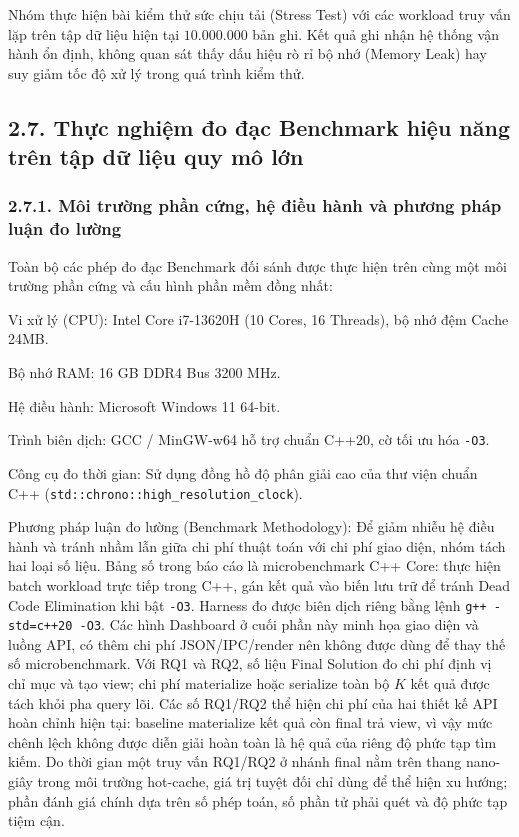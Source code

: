 \documentclass[14pt,a4paper]{extarticle}
\begin{document}
Nhóm thực hiện bài kiểm thử sức chịu tải (Stress Test) với các workload truy vấn lặp trên tập dữ liệu hiện tại $10.000.000$ bản ghi. Kết quả ghi nhận hệ thống vận hành ổn định, không quan sát thấy dấu hiệu rò rỉ bộ nhớ (Memory Leak) hay suy giảm tốc độ xử lý trong quá trình kiểm thử.

\subsection*{2.7. Thực nghiệm đo đạc Benchmark hiệu năng trên tập dữ liệu quy mô lớn}
{}

\subsubsection*{2.7.1. Môi trường phần cứng, hệ điều hành và phương pháp luận đo lường}
{}

Toàn bộ các phép đo đạc Benchmark đối sánh được thực hiện trên cùng một môi trường phần cứng và cấu hình phần mềm đồng nhất:

Vi xử lý (CPU): Intel Core i7-13620H (10 Cores, 16 Threads), bộ nhớ đệm Cache 24MB.

Bộ nhớ RAM: 16 GB DDR4 Bus 3200 MHz.

Hệ điều hành: Microsoft Windows 11 64-bit.

Trình biên dịch: GCC / MinGW-w64 hỗ trợ chuẩn C++20, cờ tối ưu hóa \texttt{-O3}.

Công cụ đo thời gian: Sử dụng đồng hồ độ phân giải cao của thư viện chuẩn C++ (\texttt{std::chrono::high\_resolution\_clock}).

Phương pháp luận đo lường (Benchmark Methodology): Để giảm nhiễu hệ điều hành và tránh nhầm lẫn giữa chi phí thuật toán với chi phí giao diện, nhóm tách hai loại số liệu. Bảng số trong báo cáo là microbenchmark C++ Core: thực hiện batch workload trực tiếp trong C++, gán kết quả vào biến lưu trữ để tránh Dead Code Elimination khi bật \texttt{-O3}. Harness đo được biên dịch riêng bằng lệnh \texttt{g++ -std=c++20 -O3}. Các hình Dashboard ở cuối phần này minh họa giao diện và luồng API, có thêm chi phí JSON/IPC/render nên không được dùng để thay thế số microbenchmark. Với RQ1 và RQ2, số liệu Final Solution đo chi phí định vị chỉ mục và tạo view; chi phí materialize hoặc serialize toàn bộ $K$ kết quả được tách khỏi pha query lõi. Các số RQ1/RQ2 thể hiện chi phí của hai thiết kế API hoàn chỉnh hiện tại: baseline materialize kết quả còn final trả view, vì vậy mức chênh lệch không được diễn giải hoàn toàn là hệ quả của riêng độ phức tạp tìm kiếm. Do thời gian một truy vấn RQ1/RQ2 ở nhánh final nằm trên thang nano-giây trong môi trường hot-cache, giá trị tuyệt đối chỉ dùng để thể hiện xu hướng; phần đánh giá chính dựa trên số phép toán, số phần tử phải quét và độ phức tạp tiệm cận.
\end{document}
